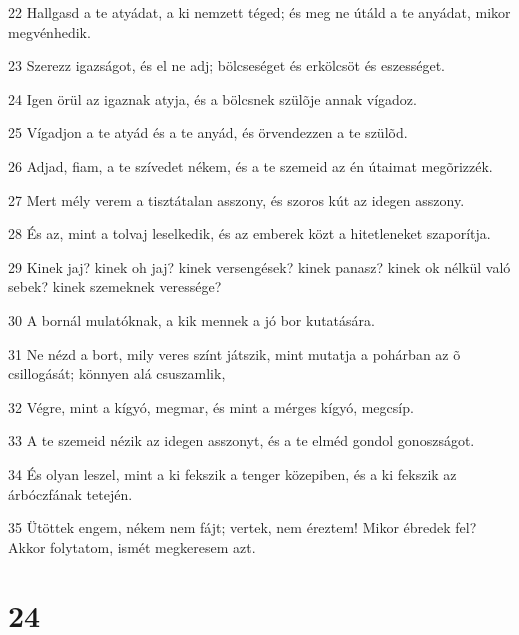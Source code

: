 \par 22 Hallgasd a te atyádat, a ki nemzett téged; és meg ne útáld a te anyádat, mikor megvénhedik.
\par 23 Szerezz igazságot, és el ne adj; bölcseséget és erkölcsöt és eszességet.
\par 24 Igen örül az igaznak atyja, és a bölcsnek szülõje annak vígadoz.
\par 25 Vígadjon a te atyád és a te anyád, és örvendezzen a te szülõd.
\par 26 Adjad, fiam, a te szívedet nékem, és a te szemeid az én útaimat megõrizzék.
\par 27 Mert mély verem a tisztátalan asszony, és szoros kút az idegen asszony.
\par 28 És az, mint a tolvaj leselkedik, és az emberek közt a hitetleneket szaporítja.
\par 29 Kinek jaj? kinek oh jaj? kinek versengések? kinek panasz? kinek ok nélkül való sebek? kinek szemeknek veressége?
\par 30 A bornál mulatóknak, a kik mennek a jó bor kutatására.
\par 31 Ne nézd a bort, mily veres színt játszik, mint mutatja a pohárban az õ csillogását; könnyen alá csuszamlik,
\par 32 Végre, mint a kígyó, megmar, és mint a mérges kígyó, megcsíp.
\par 33 A te szemeid nézik az idegen asszonyt, és a te elméd gondol gonoszságot.
\par 34 És olyan leszel, mint a ki fekszik a tenger közepiben, és a ki fekszik az árbóczfának tetején.
\par 35 Ütöttek engem, nékem nem fájt; vertek, nem éreztem! Mikor ébredek fel? Akkor folytatom, ismét megkeresem azt.

\chapter{24}

